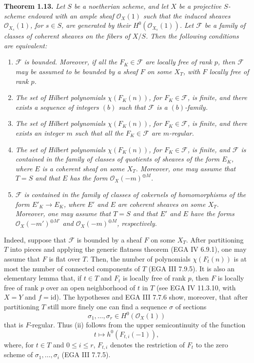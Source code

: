 
\textbf{Theorem 1.13.} \emph{Let \(S\) be a noetherian scheme, and let
\(X\) be a projective \(S\)-scheme endowed with an ample sheaf
\(\mathcal O_X(1)\) such that the induced sheaves \(\mathcal O_{X_s}(1)\),
for \(s\in S\), are generated by their \(H^0(\mathcal O_{X_s}(1))\). Let
\(\mathcal F\) be a family of classes of coherent sheaves on the fibers of
\(X/S\). Then the following conditions are equivalent:}
\begin{enumerate}[label=(\roman*)]
\item \emph{\(\mathcal F\) is bounded. Moreover, if all the
\(F_K\in\mathcal F\) are locally free of rank \(p\), then \(\mathcal F\)
may be assumed to be bounded by a sheaf \(F\) on some \(X_T\), with \(F\)
locally free of rank \(p\).}
\item \emph{The set of Hilbert polynomials \(\chi(F_K(n))\), for
\(F_K\in\mathcal F\), is finite, and there exists a sequence of integers
\((b)\) such that \(\mathcal F\) is a \((b)\)-family.}
\item \emph{The set of Hilbert polynomials \(\chi(F_K(n))\), for
\(F_K\in\mathcal F\), is finite, and there exists an integer \(m\) such
that all the \(F_K\in\mathcal F\) are \(m\)-regular.}
\item \emph{The set of Hilbert polynomials \(\chi(F_K(n))\), for
\(F_K\in\mathcal F\), is finite, and \(\mathcal F\) is contained in the
family of classes of quotients of sheaves of the form \(E_K\), where \(E\)
is a coherent sheaf on some \(X_T\). Moreover, one may assume that \(T=S\)
and that \(E\) has the form \(\mathcal O_X(-m)^{\oplus M}\).}
\item \emph{\(\mathcal F\) is contained in the family of classes of
cokernels of homomorphisms of the form \(E'_K\to E_K\), where \(E'\) and
\(E\) are coherent sheaves on some \(X_T\). Moreover, one may assume that
\(T=S\) and that \(E'\) and \(E\) have the forms
\(\mathcal O_X(-m')^{\oplus M'}\) and \(\mathcal O_X(-m)^{\oplus M}\),
respectively.}
\end{enumerate}

Indeed, suppose that \(\mathcal F\) is bounded by a sheaf \(F\) on some
\(X_T\). After partitioning \(T\) into pieces and applying the generic
flatness theorem (EGA IV 6.9.1), one may assume that \(F\) is flat over
\(T\). Then,
the number of polynomials \(\chi(F_t(n))\) is at most the number of connected
components of \(T\) (EGA III 7.9.5). It is also an elementary lemma that,
if \(t\in T\) and \(F_t\) is locally free of rank \(p\), then \(F\) is
locally free of rank \(p\) over an open neighborhood of \(t\) in \(T\)
(see EGA IV 11.3.10, with \(X=Y\) and \(f=\mathrm{id}\)). The hypotheses
and EGA III 7.7.6 show, moreover, that after partitioning \(T\) still more
finely one can find a sequence \(\sigma\) of sections
\[
\sigma_1,\ldots,\sigma_r\in H^0(\mathcal O_X(1))
\]
that is \(F\)-regular. Thus (ii) follows from the upper semicontinuity of
the function
\[
t\longmapsto h^0(F_{t,i}(-1)),
\]
where, for \(t\in T\) and \(0\le i\le r\), \(F_{t,i}\) denotes the
restriction of \(F_t\) to the zero scheme of
\(\sigma_1,\ldots,\sigma_i\) (EGA III 7.7.5).

